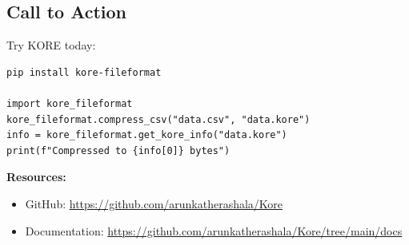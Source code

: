 \documentclass{article}
\begin{document}
\subsection*{Call to Action}

Try KORE today:

\begin{verbatim}
pip install kore-fileformat

import kore_fileformat
kore_fileformat.compress_csv("data.csv", "data.kore")
info = kore_fileformat.get_kore_info("data.kore")
print(f"Compressed to {info[0]} bytes")
\end{verbatim}

\textbf{Resources:}
\begin{itemize}
    \item GitHub: \url{https://github.com/arunkatherashala/Kore}
    \item Documentation: \url{https://github.com/arunkatherashala/Kore/tree/main/docs}
\end{itemize}
\end{document}
